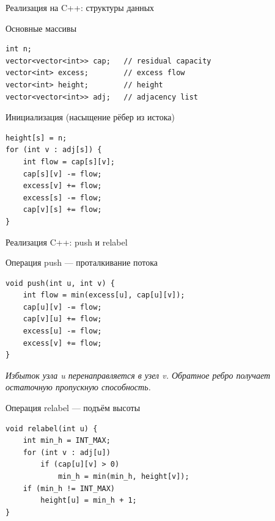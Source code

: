 \documentclass[14pt, aspectratio=169]{beamer}
\begin{document}
\begin{frame}[fragile]{Реализация на C++: структуры данных}
\scriptsize
\begin{block}{Основные массивы}
\begin{lstlisting}[numbers=none, basicstyle=\ttfamily\scriptsize]
int n;
vector<vector<int>> cap;   // residual capacity
vector<int> excess;        // excess flow
vector<int> height;        // height
vector<vector<int>> adj;   // adjacency list
\end{lstlisting}
\end{block}

\begin{block}{Инициализация (насыщение рёбер из истока)}
\begin{lstlisting}[numbers=none, basicstyle=\ttfamily\scriptsize]
height[s] = n;
for (int v : adj[s]) {
    int flow = cap[s][v];
    cap[s][v] -= flow;
    excess[v] += flow;
    excess[s] -= flow;
    cap[v][s] += flow;
}
\end{lstlisting}
\end{block}
\end{frame}

\begin{frame}[fragile]{Реализация C++: push и relabel}
\scriptsize

\begin{block}{Операция push — проталкивание потока}
\vspace{-0.2cm}
\begin{lstlisting}[numbers=none, basicstyle=\ttfamily\scriptsize]
void push(int u, int v) {
    int flow = min(excess[u], cap[u][v]);
    cap[u][v] -= flow;
    cap[v][u] += flow;
    excess[u] -= flow;
    excess[v] += flow;
}
\end{lstlisting}
\vspace{-0.2cm}
\textit{Избыток узла u перенаправляется в узел v. Обратное ребро получает остаточную пропускную способность.}
\end{block}

\begin{block}{Операция relabel — подъём высоты}
\vspace{-0.2cm}
\begin{lstlisting}[numbers=none, basicstyle=\ttfamily\scriptsize]
void relabel(int u) {
    int min_h = INT_MAX;
    for (int v : adj[u])
        if (cap[u][v] > 0)
            min_h = min(min_h, height[v]);
    if (min_h != INT_MAX)
        height[u] = min_h + 1;
}
\end{lstlisting}
\end{block}

\end{frame}
\end{document}

